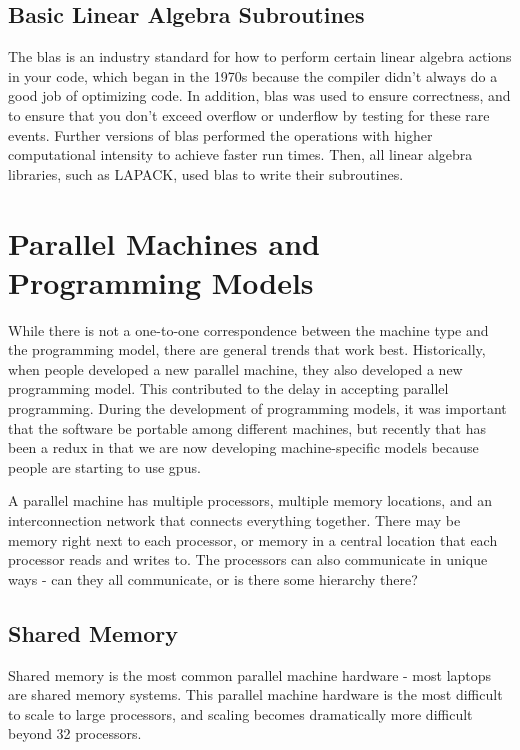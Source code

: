 \documentclass[10pt]{article}
\begin{document}
\begin{flushleft}
\subsection{Basic Linear Algebra Subroutines}

The \gls{blas} is an industry standard for how to perform certain linear algebra actions in your code, which began in the 1970s because the compiler didn't always do a good job of optimizing code. In addition, \gls{blas} was used to ensure correctness, and to ensure that you don't exceed overflow or underflow by testing for these rare events. Further versions of \gls{blas} performed the operations with higher computational intensity to achieve faster run times. Then, all linear algebra libraries, such as LAPACK, used \gls{blas} to write their subroutines.

\section{Parallel Machines and Programming Models}

While there is not a one-to-one correspondence between the machine type and the programming model, there are general trends that work best. Historically, when people developed a new parallel machine, they also developed a new programming model. This contributed to the delay in accepting parallel programming. During the development of programming models, it was important that the software be portable among different machines, but recently that has been a redux in that we are now developing machine-specific models because people are starting to use \gls{gpu}s.

A parallel machine has multiple processors, multiple memory locations, and an interconnection network that connects everything together. There may be memory right next to each processor, or memory in a central location that each processor reads and writes to. The processors can also communicate in unique ways - can they all communicate, or is there some hierarchy there?

\subsection{Shared Memory}

Shared memory is the most common parallel machine hardware - most laptops are shared memory systems. This parallel machine hardware is the most difficult to scale to large processors, and scaling becomes dramatically more difficult beyond 32 processors.


\end{flushleft}
\end{document}
